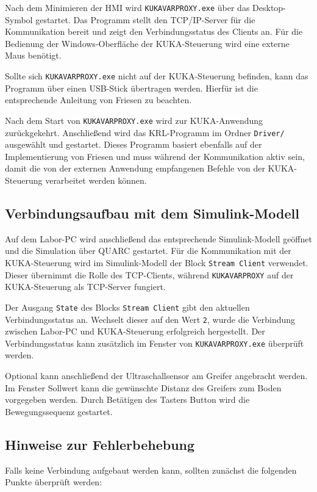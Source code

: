 Nach dem Minimieren der HMI wird \texttt{KUKAVARPROXY.exe} über das
Desktop-Symbol gestartet. Das Programm stellt den TCP/IP-Server für
die Kommunikation bereit und zeigt den Verbindungsstatus des Clients
an. Für die Bedienung der Windows-Oberfläche der KUKA-Steuerung wird
eine externe Maus benötigt.

Sollte sich \texttt{KUKAVARPROXY.exe} nicht auf der KUKA-Steuerung
befinden, kann das Programm über einen USB-Stick übertragen werden.
Hierfür ist die entsprechende Anleitung von Friesen zu beachten.

Nach dem Start von \texttt{KUKAVARPROXY.exe} wird zur
KUKA-Anwendung zurückgekehrt. Anschließend wird das KRL-Programm im
Ordner \texttt{Driver/} ausgewählt und gestartet. Dieses Programm
basiert ebenfalls auf der Implementierung von Friesen und muss
während der Kommunikation aktiv sein, damit die von der externen
Anwendung empfangenen Befehle von der KUKA-Steuerung verarbeitet
werden können.

\subsection{Verbindungsaufbau mit dem Simulink-Modell}

Auf dem Labor-PC wird anschließend das entsprechende Simulink-Modell
geöffnet und die Simulation über QUARC gestartet. Für die
Kommunikation mit der KUKA-Steuerung wird im Simulink-Modell der
Block \texttt{Stream Client} verwendet. Dieser übernimmt die Rolle
des TCP-Clients, während \texttt{KUKAVARPROXY} auf der KUKA-Steuerung
als TCP-Server fungiert.

Der Ausgang \texttt{State} des Blocks \texttt{Stream Client} gibt den
aktuellen Verbindungsstatus an. Wechselt dieser auf den Wert
\texttt{2}, wurde die Verbindung zwischen Labor-PC und KUKA-Steuerung
erfolgreich hergestellt. Der Verbindungsstatus kann zusätzlich im
Fenster von \texttt{KUKAVARPROXY.exe} überprüft werden.

Optional kann anschließend der Ultraschallsensor am Greifer
angebracht werden. Im Fenster \glqq Sollwert\grqq{} kann die
gewünschte Distanz des Greifers zum Boden vorgegeben werden. Durch
Betätigen des Tasters \glqq Button\grqq{} wird die
Bewegungssequenz gestartet.

\subsection{Hinweise zur Fehlerbehebung}

Falls keine Verbindung aufgebaut werden kann, sollten zunächst die
folgenden Punkte überprüft werden:

